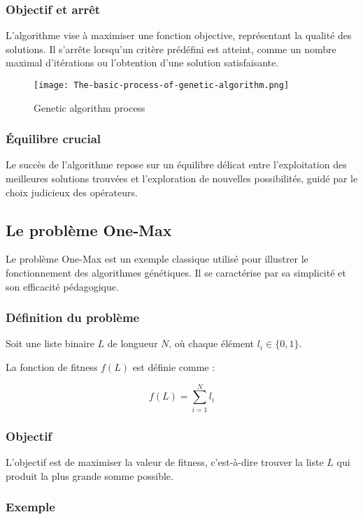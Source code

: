 \documentclass{article}
\begin{document}
\subsubsection{Objectif et arrêt}
L'algorithme vise à maximiser une fonction objective, représentant la qualité des solutions. Il s'arrête lorsqu'un critère prédéfini est atteint, comme un nombre maximal d'itérations ou l'obtention d'une solution satisfaisante.

\begin{figure}
    \centering
    \texttt{[image: The-basic-process-of-genetic-algorithm.png]}
    \caption{Genetic algorithm process}
    \label{fig:enter-label}
\end{figure}

\subsubsection{Équilibre crucial}
 Le succès de l'algorithme repose sur un équilibre délicat entre l'exploitation des meilleures solutions trouvées et l'exploration de nouvelles possibilités, guidé par le choix judicieux des opérateurs.


\subsection{Le problème One-Max}

Le problème One-Max est un exemple classique utilisé pour illustrer le fonctionnement des algorithmes génétiques. Il se caractérise par sa simplicité et son efficacité pédagogique.

\subsubsection{Définition du problème}

Soit une liste binaire $L$ de longueur $N$, où chaque élément $l_i \in \{0,1\}$.

La fonction de fitness $f(L)$ est définie comme :

\[
f(L) = \sum_{i=1}^N l_i
\]

\subsubsection{Objectif}

L'objectif est de maximiser la valeur de fitness, c'est-à-dire trouver la liste $L$ qui produit la plus grande somme possible.

\subsubsection{Exemple}
\end{document}
